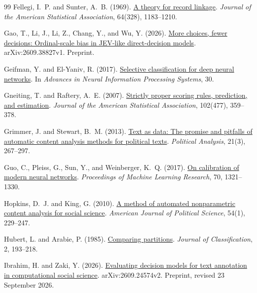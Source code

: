\documentclass[11pt,a4paper]{article}
\begin{document}
\begin{thebibliography}{99}
Fellegi, I.~P. and Sunter, A.~B. (1969).
\href{https://doi.org/10.1080/01621459.1969.10501049}{A theory for record linkage}.
\emph{Journal of the American Statistical Association}, 64(328), 1183--1210.

Gao, T., Li, J., Li, Z., Chang, Y., and Wu, Y. (2026).
\href{https://arxiv.org/abs/2609.38827v1}{More choices, fewer decisions: Ordinal-scale bias in JEV-like direct-decision models}.
arXiv:2609.38827v1. Preprint.

Geifman, Y. and El-Yaniv, R. (2017).
\href{https://proceedings.neurips.cc/paper_files/paper/2017/hash/4a8423d5e91fda00bb7e46540e2b0cf1-Abstract.html}{Selective classification for deep neural networks}.
In \emph{Advances in Neural Information Processing Systems}, 30.

Gneiting, T. and Raftery, A.~E. (2007).
\href{https://doi.org/10.1198/016214506000001437}{Strictly proper scoring rules, prediction, and estimation}.
\emph{Journal of the American Statistical Association}, 102(477), 359--378.

Grimmer, J. and Stewart, B.~M. (2013).
\href{https://doi.org/10.1093/pan/mps028}{Text as data: The promise and pitfalls of automatic content analysis methods for political texts}.
\emph{Political Analysis}, 21(3), 267--297.

Guo, C., Pleiss, G., Sun, Y., and Weinberger, K.~Q. (2017).
\href{https://proceedings.mlr.press/v70/guo17a.html}{On calibration of modern neural networks}.
\emph{Proceedings of Machine Learning Research}, 70, 1321--1330.

Hopkins, D.~J. and King, G. (2010).
\href{https://doi.org/10.1111/j.1540-5907.2009.00428.x}{A method of automated nonparametric content analysis for social science}.
\emph{American Journal of Political Science}, 54(1), 229--247.

Hubert, L. and Arabie, P. (1985).
\href{https://doi.org/10.1007/BF01908075}{Comparing partitions}.
\emph{Journal of Classification}, 2, 193--218.

Ibrahim, H. and Zaki, Y. (2026).
\href{https://arxiv.org/abs/2609.24574v2}{Evaluating decision models for text annotation in computational social science}.
arXiv:2609.24574v2. Preprint, revised 23 September 2026.


\end{thebibliography}
\end{document}
